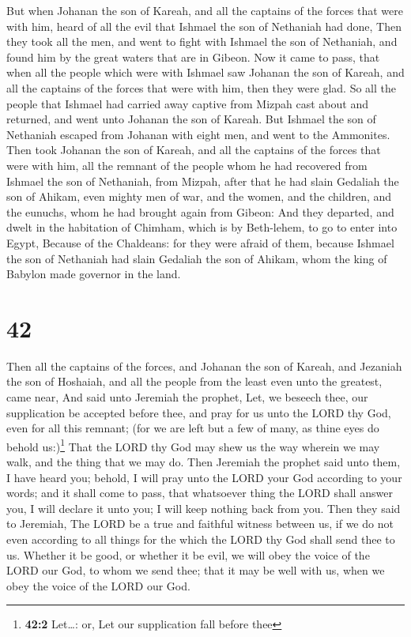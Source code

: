  But when Johanan the son of Kareah, and all the captains
of the forces that were with him, heard of all the evil that Ishmael the
son of Nethaniah had done,  Then they took all the men,
and went to fight with Ishmael the son of Nethaniah, and found him by
the great waters that are in Gibeon.  Now it came to
pass, that when all the people which were with Ishmael saw Johanan the
son of Kareah, and all the captains of the forces that were with him,
then they were glad.  So all the people that Ishmael had
carried away captive from Mizpah cast about and returned, and went unto
Johanan the son of Kareah.  But Ishmael the son of
Nethaniah escaped from Johanan with eight men, and went to the
Ammonites.  Then took Johanan the son of Kareah, and all
the captains of the forces that were with him, all the remnant of the
people whom he had recovered from Ishmael the son of Nethaniah, from
Mizpah, after that he had slain Gedaliah the son of Ahikam, even mighty
men of war, and the women, and the children, and the eunuchs, whom he
had brought again from Gibeon:  And they departed, and
dwelt in the habitation of Chimham, which is by Beth-lehem, to go to
enter into Egypt,  Because of the Chaldeans: for they
were afraid of them, because Ishmael the son of Nethaniah had slain
Gedaliah the son of Ahikam, whom the king of Babylon made governor in
the land.

\hypertarget{section-41}{%
\section{42}\label{section-41}}

 Then all the captains of the forces, and Johanan the son
of Kareah, and Jezaniah the son of Hoshaiah, and all the people from the
least even unto the greatest, came near,  And said unto
Jeremiah the prophet, Let, we beseech thee, our supplication be accepted
before thee, and pray for us unto the LORD thy God, even for all this
remnant; (for we are left but a few of many, as thine eyes do behold
us:)\footnote{\textbf{42:2} Let\ldots: or, Let our supplication fall
  before thee}  That the LORD thy God may shew us the way
wherein we may walk, and the thing that we may do.  Then
Jeremiah the prophet said unto them, I have heard you; behold, I will
pray unto the LORD your God according to your words; and it shall come
to pass, that whatsoever thing the LORD shall answer you, I will declare
it unto you; I will keep nothing back from you.  Then they
said to Jeremiah, The LORD be a true and faithful witness between us, if
we do not even according to all things for the which the LORD thy God
shall send thee to us.  Whether it be good, or whether it
be evil, we will obey the voice of the LORD our God, to whom we send
thee; that it may be well with us, when we obey the voice of the LORD
our God.

